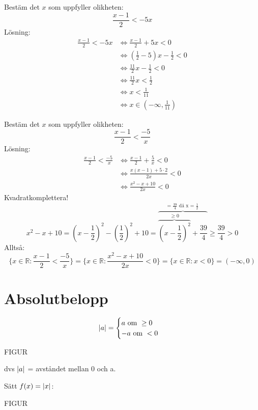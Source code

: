 \begin{Ex}
    Bestäm det $x$ som uppfyller olikheten:
    \[
    \frac{x-1}{2} < -5x
    \]
    Lösning:
    \begin{align*}
        \frac{x-1}{2} < -5x &\Leftrightarrow \frac{x-1}{2} + 5x < 0 \\
        &\Leftrightarrow (\frac{1}{2} -5)x - \frac{1}{2} < 0 \\
        &\Leftrightarrow \frac{11}{2}x - \frac{1}{2} < 0 \\
        &\Leftrightarrow \frac{11}{2}x < \frac{1}{2} \\
        &\Leftrightarrow x < \frac{1}{11} \\
        &\Leftrightarrow x \in (-\infty, \frac{1}{11})
    \end{align*}
\end{Ex}
\begin{Ex}
    Bestäm det $x$ som uppfyller olikheten:
    \[
    \frac{x-1}{2} < \frac{-5}{x}
    \]
    Lösning:
    \begin{align*}
        \frac{x-1}{2} < \frac{-5}{x} &\Leftrightarrow \frac{x-1}{2} + \frac{5}{x} < 0 \\
        &\Leftrightarrow \frac{x(x-1) + 5 \cdot 2}{2x} < 0 \\
        &\Leftrightarrow \frac{x^2 - x + 10}{2x} < 0
    \end{align*}
    Kvadratkomplettera!
    \[
    x^2 - x + 10 = (x - \frac{1}{2})^2 - (\frac{1}{2})^2 + 10 = \overbrace{\overbrace{(x - \frac{1}{2})^2}^{\ge 0} + \frac{39}{4}}^\text{= $\frac{39}{4}$ då x = $\frac{1}{2}$} \ge \frac{39}{4} > 0
    \]
    Alltså:
    \[
    \{x \in \mathbb{R}: \frac{x-1}{2} < \frac{-5}{x}\} = \{x \in \mathbb{R}: \frac{x^2 - x + 10}{2x} < 0 \} = \{x \in \mathbb{R}: x < 0\} = (-\infty, 0)
    \]
\end{Ex}
\section{Absolutbelopp} %
\label{sec:absolutbelopp}
\begin{Def}
    \[
    \lvert a\rvert =
    \begin{cases}
        a \mbox{ om } \ge 0\\
        -a \mbox{ om } < 0
    \end{cases}
    \]
    \begin{center}
        FIGUR
    \end{center}
    dvs $\lvert a\rvert$ = avståndet mellan 0 och a.
\end{Def}
Sätt $f(x) = \lvert x\rvert$:
\begin{center}
    FIGUR
\end{center}
